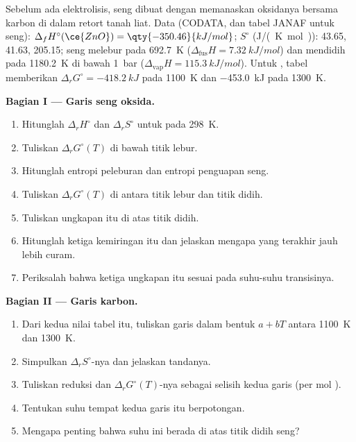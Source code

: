 \begin{problem}
\label{pb:b2:ellingham:1}
Sebelum ada elektrolisis, seng dibuat dengan memanaskan oksidanya bersama
karbon di dalam retort tanah liat. Data (CODATA, dan tabel JANAF untuk
seng): $\Delta_f H^\circ(\ce{ZnO})
= \qty{-350.46}{kJ/mol}$; $S^\circ$
(\unit{J/(K.mol)}):  43.65,  41.63,  205.15; seng
melebur pada \qty{692.7}{K} ($\Delta_{\text{fus}}H =
\qty{7.32}{kJ/mol}$)
dan mendidih pada \qty{1180.2}{K} di bawah \qty{1}{bar}
($\Delta_{\text{vap}}H = \qty{115.3}{kJ/mol}$). Untuk ,
tabel memberikan $\Delta_r G^\circ = \qty{-418.2}{kJ}$ pada \qty{1100}{K}
dan \qty{-453.0}{kJ} pada \qty{1300}{K}.

\medskip
\noindent\textbf{Bagian I --- Garis seng oksida.}
\begin{enumerate}
  \item Hitunglah $\Delta_r H^\circ$ dan $\Delta_r S^\circ$ untuk
         pada \qty{298}{K}.
  \item Tuliskan $\Delta_r G^\circ(T)$ di bawah titik lebur.
  \item Hitunglah entropi peleburan dan entropi penguapan seng.
  \item Tuliskan $\Delta_r G^\circ(T)$ di antara titik lebur dan titik
        didih.
  \item Tuliskan ungkapan itu di atas titik didih.
  \item Hitunglah ketiga kemiringan itu dan jelaskan mengapa yang terakhir
        jauh lebih curam.
  \item Periksalah bahwa ketiga ungkapan itu sesuai pada suhu-suhu
        transisinya.
\end{enumerate}

\medskip
\noindent\textbf{Bagian II --- Garis karbon.}
\begin{enumerate}[resume]
  \item Dari kedua nilai tabel itu, tuliskan garis 
        dalam bentuk $a + bT$ antara \qty{1100}{K} dan \qty{1300}{K}.
  \item Simpulkan $\Delta_r S^\circ$-nya dan jelaskan tandanya.
  \item Tuliskan reduksi  dan $\Delta_r
        G^\circ(T)$-nya sebagai selisih kedua garis (per mol ).
  \item Tentukan suhu tempat kedua garis itu berpotongan.
  \item Mengapa penting bahwa suhu ini berada di atas titik didih seng?
\end{enumerate}


\end{problem}
